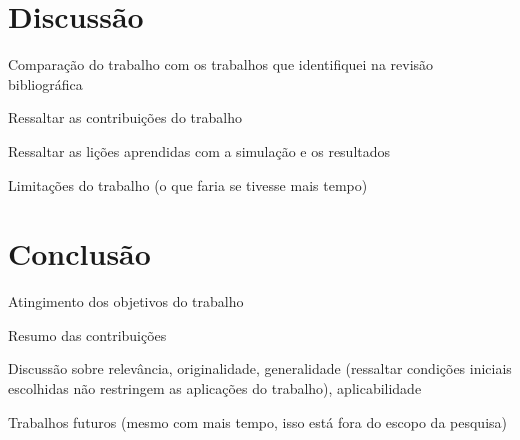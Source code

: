 \section{Discussão}
Comparação do trabalho com os trabalhos que identifiquei na revisão bibliográfica

Ressaltar as contribuições do trabalho

Ressaltar as lições aprendidas com a simulação e os resultados

Limitações do trabalho (o que faria se tivesse mais tempo)


\section{Conclusão}

Atingimento dos objetivos do trabalho

Resumo das contribuições

Discussão sobre relevância, originalidade, generalidade (ressaltar condições iniciais escolhidas não restringem as aplicações do trabalho), aplicabilidade

Trabalhos futuros (mesmo com mais tempo, isso está fora do escopo da pesquisa)


